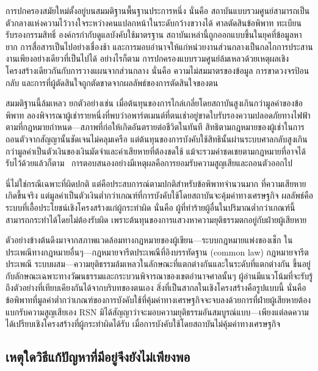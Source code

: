 \documentclass[11pt,a4paper,twocolumn]{article}
\begin{document}
การปกครองสมัยใหม่ตั้งอยู่บนสมมติฐานพื้นฐานประการหนึ่ง นั่นคือ สถาบันแบบรวมศูนย์สามารถเป็นตัวกลางแห่งความไว้วางใจระหว่างคนแปลกหน้าในระดับกว้างขวางได้ ศาลตัดสินข้อพิพาท ทะเบียนรับรองกรรมสิทธิ์ องค์กรกำกับดูแลบังคับใช้มาตรฐาน สถาบันเหล่านี้ถูกออกแบบขึ้นในยุคที่ข้อมูลหายาก การสื่อสารเป็นไปอย่างเชื่องช้า และการมอบอำนาจให้แก่หน่วยงานส่วนกลางเป็นกลไกการประสานงานเพียงอย่างเดียวที่เป็นไปได้ อย่างไรก็ตาม การปกครองแบบรวมศูนย์ล้มเหลวด้วยเหตุผลเชิงโครงสร้างเดียวกันกับการวางแผนจากส่วนกลาง นั่นคือ ความไม่สมมาตรของข้อมูล การขาดวงจรป้อนกลับ และการที่ผู้ตัดสินใจถูกตัดขาดจากผลลัพธ์ของการตัดสินใจของตน

สมมติฐานนี้ล้มเหลว ยกตัวอย่างเช่น เมื่อต้นทุนของการไกล่เกลี่ยโดยสถาบันสูงเกินกว่ามูลค่าของข้อพิพาท ลองพิจารณาผู้เช่ารายหนึ่งที่พบว่าอพาร์ตเมนต์ที่ตนเช่าอยู่ขาดใบรับรองความปลอดภัยทางไฟฟ้าตามที่กฎหมายกำหนด---สภาพที่ก่อให้เกิดอันตรายต่อชีวิตในทันที สิทธิตามกฎหมายของผู้เช่าในการถอนตัวจากสัญญานั้นชัดเจนไม่คลุมเครือ แต่ต้นทุนของการบังคับใช้สิทธินั้นผ่านระบบศาลกลับสูงเกินกว่ามูลค่าเป็นตัวเงินของเงินมัดจำและค่าเสียหายที่ต้องชดใช้ แม้จะรวมค่าชดเชยตามกฎหมายที่อาจได้รับไว้ด้วยแล้วก็ตาม~\cite{czcourtfees} การตอบสนองอย่างมีเหตุผลคือการยอมรับความสูญเสียและถอนตัวออกไป

นี่ไม่ใช่กรณีเฉพาะที่ผิดปกติ แต่คือประสบการณ์ตามปกติสำหรับข้อพิพาทจำนวนมาก ที่ความเสียหายเกิดขึ้นจริง แต่มูลค่าเป็นตัวเงินต่ำกว่าเกณฑ์ที่การบังคับใช้โดยสถาบันจะคุ้มค่าทางเศรษฐกิจ ผลลัพธ์คือระบบที่เอื้อประโยชน์เชิงโครงสร้างแก่ผู้กระทำผิด นั่นคือ ผู้ที่ทำร้ายผู้อื่นในปริมาณต่ำกว่าเกณฑ์นี้สามารถกระทำได้โดยไม่ต้องรับผิด เพราะต้นทุนของการแสวงหาความยุติธรรมตกอยู่กับฝ่ายผู้เสียหาย

ตัวอย่างข้างต้นดึงมาจากสภาพแวดล้อมทางกฎหมายของผู้เขียน---ระบบกฎหมายแพ่งของเช็ก ในประเพณีทางกฎหมายอื่นๆ---กฎหมายจารีตประเพณีที่อิงบรรทัดฐาน (common law) กฎหมายจารีตประเพณี ระบบผสม---ความยุติธรรมล้มเหลวในลักษณะที่แตกต่างกันและในระดับที่แตกต่างกัน ขึ้นอยู่กับลักษณะเฉพาะทางวัฒนธรรมและกระบวนพิจารณาของเขตอำนาจศาลนั้นๆ ผู้อ่านมีแนวโน้มที่จะรับรู้ถึงตัวอย่างที่เทียบเคียงกันได้จากบริบทของตนเอง สิ่งที่เป็นสากลในเชิงโครงสร้างคือรูปแบบนี้ นั่นคือ ข้อพิพาทที่มูลค่าต่ำกว่าเกณฑ์ของการบังคับใช้ที่คุ้มค่าทางเศรษฐกิจจะจบลงด้วยการที่ฝ่ายผู้เสียหายต้องแบกรับความสูญเสียเอง RSN มิได้สัญญาว่าจะมอบความยุติธรรมอันสมบูรณ์แบบ---เพียงแต่ลดความได้เปรียบเชิงโครงสร้างที่ผู้กระทำผิดได้รับ เมื่อการบังคับใช้โดยสถาบันไม่คุ้มค่าทางเศรษฐกิจ

\subsection{เหตุใดวิธีแก้ปัญหาที่มีอยู่จึงยังไม่เพียงพอ}
\end{document}
